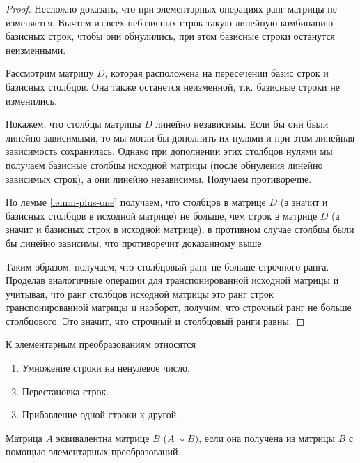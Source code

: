\begin{proof}
  Несложно доказать, что при элементарных операциях ранг матрицы не изменяется.
  Вычтем из всех небазисных строк такую линейную комбинацию базисных строк,
  чтобы они обнулились, при этом базисные строки останутся неизменными.
  
  Рассмотрим матрицу \(D\), которая расположена на пересечении базис строк и
  базисных столбцов. Она также останется неизменной, т.к. базисные строки не
  изменились.
  
  Покажем, что столбцы матрицы \(D\) линейно независимы. Если бы они были
  линейно зависимыми, то мы могли бы дополнить их нулями и при этом линейная
  зависимость сохранилась. Однако при дополнении этих столбцов нулями мы
  получаем базисные столбцы исходной матрицы (после обнуления линейно зависимых
  строк), а они линейно независимы. Получаем противоречие.
  
  По лемме \ref{lem:n-plus-one} получаем, что столбцов в матрице \(D\) (а значит
  и базисных столбцов в исходной матрице) не больше, чем строк в матрице \(D\)
  (а значит и базисных строк в исходной матрице), в противном случае столбцы
  были бы линейно зависимы, что противоречит доказанному выше.
  
  Таким образом, получаем, что столбцовый ранг не больше строчного ранга.
  Проделав аналогичные операции для транспонированной исходной матрицы и
  учитывая, что ранг столбцов исходной матрицы это ранг строк транспонированной
  матрицы и наоборот, получим, что строчный ранг не больше столбцового. Это
  значит, что строчный и столбцовый ранги равны.
\end{proof}

\begin{remark}
  К элементарным преобразованиям относятся
  
  \begin{enumerate}
  \item
    Умножение строки на ненулевое число.
    
  \item
    Перестановка строк.
    
  \item
    Прибавление одной строки к другой.
  \end{enumerate}
\end{remark}

\begin{definition}
  Матрица \(A\) эквивалентна матрице \(B\) (\(A \sim B\)), если она получена из
  матрицы \(B\) с помощью элементарных преобразований.
\end{definition}
